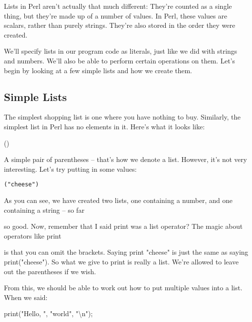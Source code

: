 \documentclass[a4paper,11pt]{book}
\begin{document}
Lists in Perl aren't actually that much different: They're counted as a single thing, but they're made up of a number of values. In Perl, these values are scalars, rather than purely strings. They're also stored in the order they were created.

We'll specify lists in our program code as literals, just like we did with strings and numbers. We'll also be able to perform certain operations on them. Let's begin by looking at a few simple lists and how we create them.

\subsection{Simple Lists}

\noindent 

\noindent The simplest shopping list is one where you have nothing to buy. Similarly, the simplest list in Perl has no elements in it. Here's what it looks like:

\noindent 

\noindent 

\noindent ()

\noindent 

\noindent A simple pair of parentheses -- that's how we denote a list. However, it's not very interesting. Let's try putting in some values:

\begin{verbatim}
("cheese") 
\end{verbatim}


\noindent 

\noindent As you can see, we have created two lists, one containing a number, and one containing a string -- so far

\noindent so good. Now, remember that I said print was a list operator? The magic about operators like print

\noindent is that you can omit the brackets. Saying print "cheese" is just the same as saying print("cheese"). So what we give to print is really a list. We're allowed to leave out the parentheses if we wish.

\noindent 

\noindent From this, we should be able to work out how to put multiple values into a list. When we said:

\noindent 

\noindent 

\noindent print("Hello, ", "world", "\textbackslash n");

\noindent 
\end{document}
